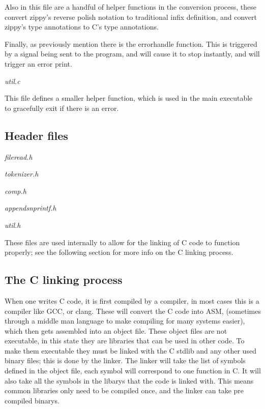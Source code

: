 \documentclass[a4paper,12pt]{article}
\begin{document}
{Also in this file are a handful of helper functions in the conversion process, these convert zippy's reverse polish notation to traditional 
infix definition, and convert zippy's type annotations to C's type annotations.

Finally, as previously mention there is the errorhandle function. This is triggered by a signal being sent to the program, and will cause 
it to stop instantly, and will trigger an error print.


\textit{util.c}

This file defines a smaller helper function, which is used in the main executable to gracefully exit if there is an error.

\subsection{Header files}

\textit{fileread.h}

\textit{tokenizer.h}

\textit{comp.h}

\textit{appendsnprintf.h}

\textit{util.h}

These files are used internally to allow for the linking of C code to function properly; see the following section for 
more info on the C linking process.

\subsection{The C linking process}
When one writes C code, it is first compiled by a compiler, in most cases this is a compiler like GCC, or clang.
These will convert the C code into ASM, (sometimes through a middle man language to make compiling for many systems
easier), which then gets assembled into an object file. These object files are not executable, in this state they
are libraries that can be used in other code. To make them executable they must be linked with the C stdlib and any
other used binary files; this is done by the linker. The linker will take the list of symbols defined in the object file,
each symbol will correspond to one function in C. It will also take all the symbols in the libarys that the code is linked 
with. This means common libraries only need to be compiled once, and the linker can take pre compiled binarys.

}
\end{document}
